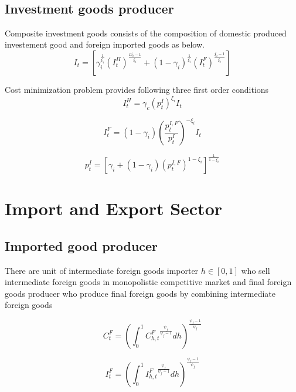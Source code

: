 \documentclass[11pt, a4paper]{article}
\begin{document}
~\\

\subsection {Investment goods producer} 
\normalsize
 Composite investment goods consists of the composition of domestic produced investement good and foreign imported goods as below.
\[I_t = \left[\gamma_i ^{\frac{1}{\xi_i}} (I_t^H )^{\frac{xi_i -1}{\xi_i}} +(1-\gamma_i) ^{\frac{1}{\xi_i}} (I_t^F )^{\frac{\xi_i -1}{\xi_i}}  \right] \]

Cost minimization problem provides following three first order conditions \\
\begin{equation}
I_t^H = \gamma_c \left({p_t^{I}}  \right) ^{\xi_i} I_t
\end{equation}

\begin{equation} I_t^F = (1-\gamma_i ) \left(\frac{p_t^{I,F}}{p_t^I}  \right) ^{-\xi_i} I_t \end{equation}

\begin{equation}p_t^I = \left[ \gamma_i  +(1-\gamma_i) {(p_t^{I,F})}^{{1-\xi_i}}  \right]  ^{\frac{1}{1-\xi_i}} \end{equation}




\section {Import and Export Sector}
\subsection{Imported good producer}
\normalsize 
There are unit of intermediate foreign goods importer $h \in [0, 1]$ who sell intermediate foreign goods in monopolistic competitive market and final foreign goods producer who produce final foreign goods by combining intermediate foreign goods  

 \begin{displaymath}  C_t^F = \left(\int_{0}^{1}   {C_{h,t}^F}^{\frac{\psi_f}{\psi_f-1}} dh\right)^{\frac{\psi_f-1}{\psi_f}} \end{displaymath}

 \begin{displaymath}  I_t^F = \left(\int_{0}^{1}   {I_{h,t}^F}^{\frac{\psi_f}{\psi_f-1}} dh\right)^{\frac{\psi_f-1}{\psi_f}} \end{displaymath}
\end{document}
